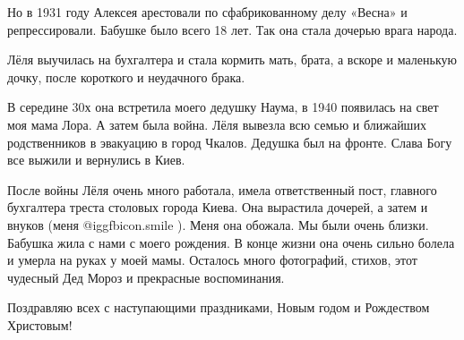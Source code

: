 \raggedcolumns
\begin{multicols}{4} %
\setlength{\parindent}{0pt}








\end{multicols} %

\raggedcolumns
\begin{multicols}{4} %
\setlength{\parindent}{0pt}


\end{multicols} %

\zzrule

Но в 1931 году Алексея арестовали по сфабрикованному делу «Весна» и
репрессировали. Бабушке было всего 18 лет. Так она стала дочерью врага народа. 

Лёля выучилась на бухгалтера и стала кормить мать, брата, а вскоре и маленькую
дочку, после короткого и неудачного брака.

В середине 30х она встретила моего дедушку Наума, в 1940 появилась на свет моя
мама Лора. А затем была война. Лёля вывезла всю семью и ближайших родственников
в эвакуацию в город Чкалов. Дедушка был на фронте. Слава Богу все выжили и
вернулись в Киев.

После войны Лёля очень много работала, имела ответственный пост, главного
бухгалтера треста столовых города Киева. Она вырастила дочерей, а затем и
внуков (меня  @igg{fbicon.smile} ). Меня она обожала. Мы были очень близки. Бабушка жила с нами с
моего рождения. В конце жизни она очень сильно болела и умерла на руках у моей
мамы. Осталось много фотографий, стихов, этот чудесный Дед Мороз и прекрасные
воспоминания.

Поздравляю всех с наступающими праздниками, Новым годом и Рождеством Христовым!


